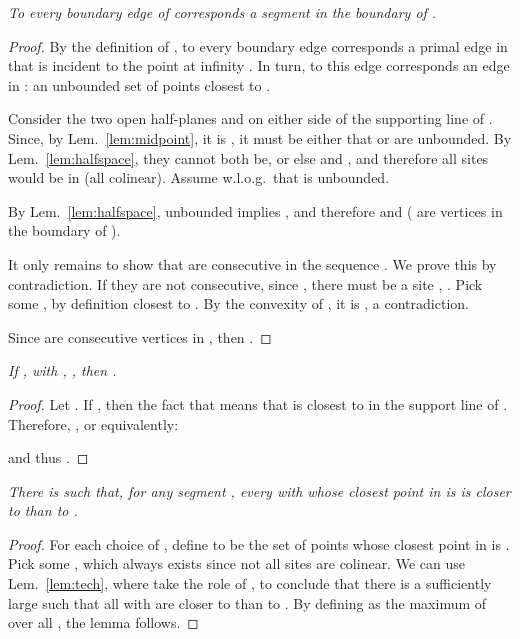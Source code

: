 \documentclass[11pt]{article}
\begin{document}
\emph{	To every boundary edge  of  corresponds a segment in the boundary of .  \emph{}
}
\begin{proof}
By the definition of , 
to every boundary edge  corresponds a primal edge in 
that is incident to the point at infinity . 
In turn, to this edge corresponds an edge in : 
an unbounded set  of points closest to .


Consider the two open half-planes  and  on either
side of the supporting line  of . 
Since, by Lem.~\ref{lem:midpoint}, it is , it must be either that  or
 are unbounded. 
By Lem.~\ref{lem:halfspace}, they cannot both be, or else 
 and , and therefore all sites
would be in  (all colinear). 
Assume w.l.o.g.\  that  is unbounded. 

By Lem.~\ref{lem:halfspace},  unbounded implies 
, and therefore
 and   
( are vertices in the boundary of ). 

It only remains to show that  are consecutive in the sequence . 
We prove this by contradiction. 
If they are not consecutive, since , 
there must be a site , . 
Pick some
, by definition closest to . 
By the convexity of , it is , a contradiction. 

Since  are consecutive vertices in , then 
. 
\end{proof}






\emph{
	If , with , , then
. }
\begin{proof}
	Let . If , 
then the fact that  means that  is closest to 
in the support line of . Therefore, , or equivalently:

and thus . 
\end{proof}




\emph{
	There is  such that, for any segment , every  with 
    whose closest point in  is  is 
	closer to  than to . }
\begin{proof}





For each choice of , define  to be the set of
points  whose closest point in  is
. 
Pick some , which always exists
since not all sites are colinear. 
We can use Lem.~\ref{lem:tech}, 
where  take the role of , 
to conclude that 
there is a sufficiently large  such that all  with
 are closer to  than to . 
By defining  as the maximum of  over all
, the lemma follows. 
\end{proof}
\end{document}
